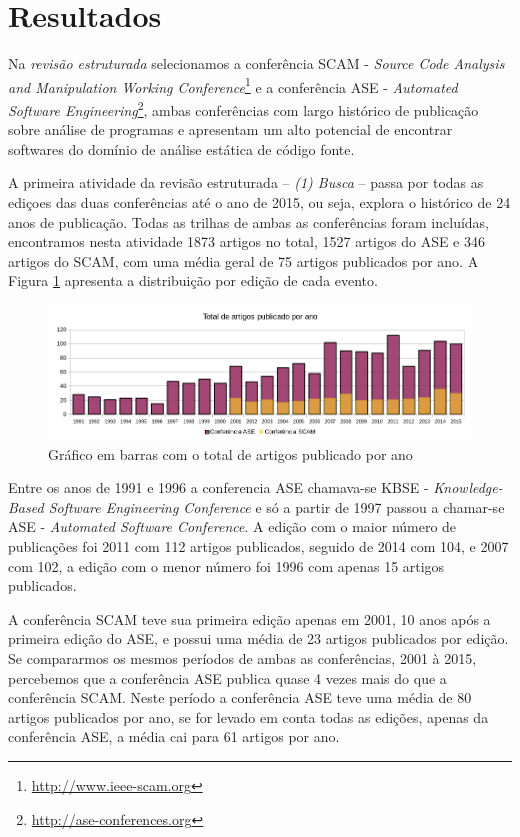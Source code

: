 \section{Resultados}

Na {\it revisão estruturada} selecionamos a conferência SCAM - {\it
Source Code Analysis and Manipulation Working
Conference}\footnote{\url{http://www.ieee-scam.org}} e a conferência ASE - {\it
Automated Software Engineering}\footnote{\url{http://ase-conferences.org}},
ambas conferências com largo histórico de publicação sobre análise de
programas e apresentam um alto potencial de encontrar softwares do domínio de
análise estática de código fonte.

A primeira atividade da revisão estruturada -- {\it (1) Busca} -- passa por
todas as ediçoes das duas conferências até o ano de 2015, ou seja, explora o
histórico de 24 anos de publicação. Todas as trilhas de ambas as conferências
foram incluídas, encontramos nesta atividade 1873 artigos no total, 1527 artigos
do ASE e 346 artigos do SCAM, com uma média geral de 75 artigos publicados por ano. A
Figura \ref{artigos-por-ano} apresenta a distribuição por edição de cada
evento.

\begin{figure}[h]
  \center
  \includegraphics[scale=0.65]{imagens/artigos-por-ano.png}
  \caption{Gráfico em barras com o total de artigos publicado por ano}
  \label{artigos-por-ano}
\end{figure}

Entre os anos de 1991 e 1996 a conferencia ASE chamava-se KBSE - {\it
Knowledge-Based Software Engineering Conference} e só a partir de 1997 passou a
chamar-se ASE - {\it Automated Software Conference}. A edição com o maior
número de publicações foi 2011 com 112 artigos publicados, seguido de 2014 com
104, e 2007 com 102, a edição com o menor número foi 1996 com apenas 15 artigos
publicados.

A conferência SCAM teve sua primeira edição apenas em 2001, 10 anos após a
primeira edição do ASE, e possui uma média de 23 artigos publicados por edição.
Se compararmos os mesmos períodos de ambas as conferências, 2001 à 2015,
percebemos que a conferência ASE publica quase 4 vezes mais do que a
conferência SCAM. Neste período a conferência ASE teve uma média de 80 artigos
publicados por ano, se for levado em conta todas as edições, apenas da
conferência ASE, a média cai para 61 artigos por ano.

